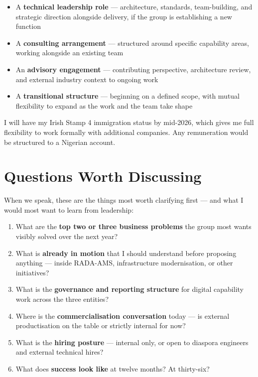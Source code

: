 \documentclass[10pt]{article}
\newcommand{\spacer}{\vspace{10pt}}
\newcommand{\bigspacer}{\vspace{16pt}}
\begin{document}
\spacer
\small
\begin{itemize}[leftmargin=1.8em, itemsep=4pt]
  \item A \textbf{technical leadership role} --- architecture, standards,
        team-building, and strategic direction alongside delivery, if the
        group is establishing a new function
  \item A \textbf{consulting arrangement} --- structured around specific
        capability areas, working alongside an existing team
  \item An \textbf{advisory engagement} --- contributing perspective,
        architecture review, and external industry context to ongoing work
  \item A \textbf{transitional structure} --- beginning on a defined scope,
        with mutual flexibility to expand as the work and the team take shape
\end{itemize}
\normalsize

\spacer
I will have my Irish Stamp 4 immigration status by mid-2026, which gives me
full flexibility to work formally with additional companies. Any remuneration
would be structured to a Nigerian account.

\bigspacer

\section{Questions Worth Discussing}

When we speak, these are the things most worth clarifying first --- and what
I would most want to learn from leadership:

\spacer
\small
\begin{enumerate}[leftmargin=1.8em, itemsep=4pt]
  \item What are the \textbf{top two or three business problems} the group
        most wants visibly solved over the next year?
  \item What is \textbf{already in motion} that I should understand before
        proposing anything --- inside RADA-AMS, infrastructure modernisation,
        or other initiatives?
  \item What is the \textbf{governance and reporting structure} for digital
        capability work across the three entities?
  \item Where is the \textbf{commercialisation conversation} today --- is
        external productisation on the table or strictly internal for now?
  \item What is the \textbf{hiring posture} --- internal only, or open to
        diaspora engineers and external technical hires?
  \item What does \textbf{success look like} at twelve months? At thirty-six?
\end{enumerate}
\normalsize
\end{document}

